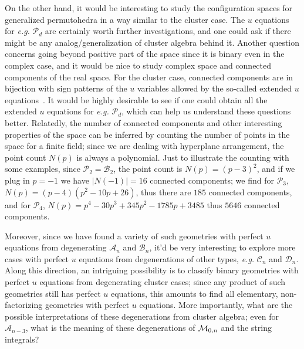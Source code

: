 \documentclass[hidelinks,12pt]{article}
\begin{document}
On the other hand, it would be interesting to study the configuration spaces for generalized permutohedra in a way similar to the cluster case. The $u$ equations for {\it e.g.} ${\mathscr P}_d$ are certainly worth further investigations, and one could ask if there might be any analog/generalization of cluster algebra behind it. Another question concerns going beyond positive part of the space since it is binary even in the complex case, and it would be nice to study complex space and connected components of the real space. For the cluster case, connected components are in bijection with sign patterns of the $u$ variables allowed by the so-called extended $u$ equations~\cite{Arkani-Hamed:2019plo}. It would be highly desirable to see if one could obtain all the extended $u$ equations for {\it e.g.} ${\mathscr P}_d$, which can help us understand these questions better. Relatedly, the number of connected components and other interesting properties of the space can be inferred by counting the number of points in the space for a finite field; since we are dealing with hyperplane arrangement, the point count $N(p)$ is always a polynomial. Just to illustrate the counting with some examples, since ${\mathscr P}_2={\mathscr B}_2$, the point count is $N(p)=(p-3)^2$, and if we plug in $p=-1$ we have $|N(-1)|=16$ connected components; we find for ${\mathscr P}_3$, $N(p)=(p-4)(p^2-10p+26)$, thus there are $185$ connected components, and for ${\mathscr P}_4$, $N(p)=p^4- 30 p^3+ 345 p^2- 1785 p+3485$ thus $5646$ connected components. 

Moreover, since we have found a variety of such geometries with perfect $u$ equations from degenerating ${\mathscr A}_n$ and ${\mathscr B}_n$, it'd be very interesting to explore more cases with perfect $u$ equations from degenerations of other types, {\it e.g.} ${\mathscr C_n}$ and ${\mathscr D_n}$. Along this direction, an intriguing possibility is to classify binary geometries with perfect $u$ equations from degenerating cluster cases; since any product of such geometries still has perfect $u$ equations, this amounts to find all elementary, non-factorizing geometries with perfect $u$ equations. More importantly,  what are the possible interpretations of these degenerations from cluster algebra; even for ${\mathscr A}_{n-3}$, what is the meaning of these degenerations of ${\cal M}_{0,n}$ and the string integrals?
\end{document}
